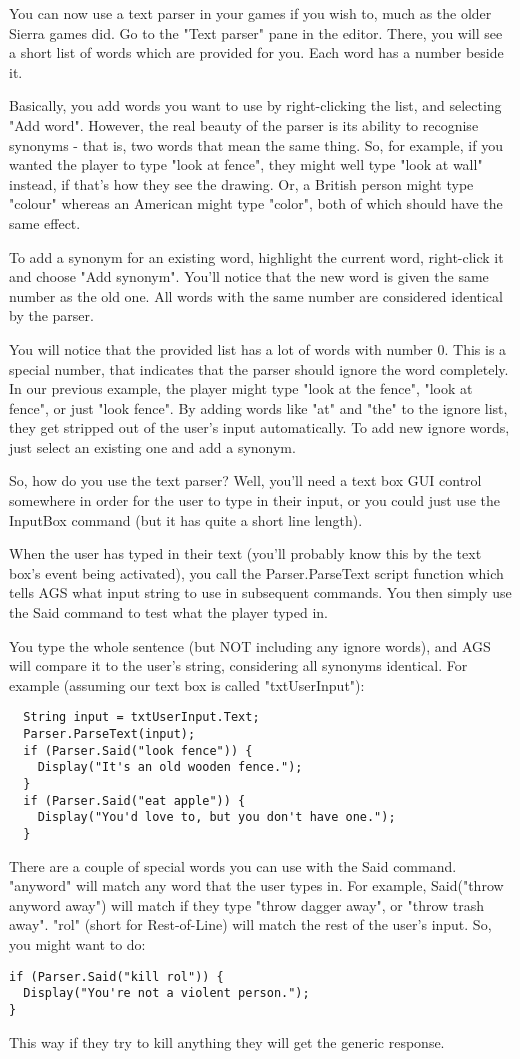 You can now use a text parser in your games if you wish to, much as the older
Sierra games did.  Go to the "Text parser" pane in the editor. There, you
will see a short list of words which are provided for you. Each word has a
number beside it.

Basically, you add words you want to use by right-clicking the list, and
selecting "Add word".
However, the real beauty of the parser is its ability to recognise synonyms -
that is, two words that mean the same thing. So, for example, if you wanted
the player to type "look at fence", they might well type "look at wall"
instead, if that's how they see the drawing. Or, a British person might type
"colour" whereas an American might type "color", both of which should have
the same effect.

To add a synonym for an existing word, highlight the current word, right-click it
and choose "Add synonym". You'll notice that the new word is given the same
number as the old one. All words with the same number are considered identical
by the parser.

You will notice that the provided list has a lot of words with number 0. This
is a special number, that indicates that the parser should ignore the word
completely. In our previous example, the player might type "look at the fence",
"look at fence", or just "look fence". By adding words like "at" and "the" to
the ignore list, they get stripped out of the user's input automatically. To
add new ignore words, just select an existing one and add a synonym.

So, how do you use the text parser? Well, you'll need a text box GUI control
somewhere in order for the user to type in their input, or you could just
use the InputBox command (but it has quite a short line length).

When the user has typed in their text (you'll probably know this by the text
box's event being activated), you call the  Parser.ParseText  script
function which tells AGS what input string to use in subsequent commands.
You then simply use the Said command to test what the player typed in.

You type the whole sentence (but NOT including any ignore words), and AGS will
compare it to the user's string, considering all synonyms identical.
For example (assuming our text box is called "txtUserInput"):
\begin{verbatim}
  String input = txtUserInput.Text;
  Parser.ParseText(input);
  if (Parser.Said("look fence")) {
    Display("It's an old wooden fence.");
  }
  if (Parser.Said("eat apple")) {
    Display("You'd love to, but you don't have one.");
  }
\end{verbatim}
There are a couple of special words you can use with the Said command.
"anyword" will match any word that the user types in. For example,
Said("throw anyword away")  will match if they type "throw dagger away",
or "throw trash away".
"rol" (short for Rest-of-Line) will match the rest of the user's input. So,
you might want to do:
\begin{verbatim}
if (Parser.Said("kill rol")) {
  Display("You're not a violent person.");
}
\end{verbatim}
This way if they try to kill anything they will get the generic response.

